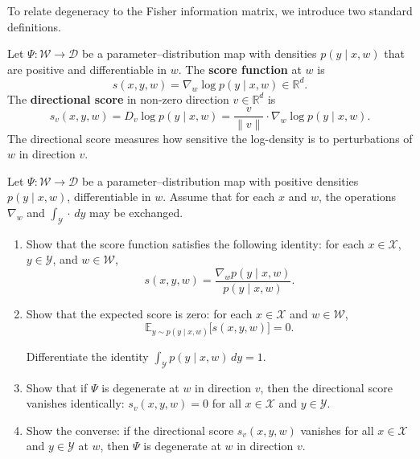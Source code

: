 \documentclass[11pt]{article}
\newcommand{\R}{\mathbb{R}}
\newcommand{\E}{\mathbb{E}}
\newcommand{\X}{\mathcal{X}}
\newcommand{\Y}{\mathcal{Y}}
\newcommand{\W}{\mathcal{W}}
\newcommand{\D}{\mathcal{D}}
\begin{document}
To relate degeneracy to the Fisher information matrix, we introduce two
standard definitions.

\begin{definition}
\label{def:score}
    Let $\Psi : \W \to \D$ be a parameter--distribution map with densities
    $p(y \mid x, w)$ that are positive and differentiable in $w$.
    The \textbf{score function} at $w$ is
    \begin{equation}\label{eq:score}
        s(x, y, w) = \nabla_w \log p(y \mid x, w) \in \R^d.
    \end{equation}
    The \textbf{directional score} in non-zero direction $v \in \R^d$ is
    \begin{equation}\label{eq:directional-score}
        s_v(x, y, w)
        = D_v \log p(y \mid x, w)
        = \frac{v}{\|v\|} \cdot \nabla_w \log p(y \mid x, w).
    \end{equation}
    The directional score measures how sensitive the log-density is to
    perturbations of $w$ in direction $v$.
\end{definition}

\begin{exercise}
\label{ex:score-properties}
    Let $\Psi : \W \to \D$ be a parameter--distribution map with positive
    densities $p(y \mid x, w)$, differentiable in $w$. Assume that for
    each $x$ and $w$, the operations $\nabla_w$ and
    $\int_\Y \cdot\, dy$ may be exchanged.
\begin{enumerate}
    \item
        Show that the score function satisfies the following identity:
        for each $x \in \X$, $y \in \Y$, and $w \in \W$,
        \begin{equation}\label{eq:score-identity}
            s(x,y,w) = \frac{\nabla_w p(y \mid x,w)}{p(y \mid x,w)}.
        \end{equation}
    \item
        Show that the expected score is zero: for each $x \in \X$ and
        $w \in \W$,
        \begin{equation}
            \E_{y \sim p(y \mid x, w)}\bigl[s(x, y, w)\bigr] = 0.
        \end{equation}
        \begin{hint}
Differentiate the identity
            $\int_\Y p(y \mid x, w) \, dy = 1$.
        \end{hint}
    \item\label{ex:score-properties:b}
        Show that if $\Psi$ is degenerate at $w$ in direction $v$, then
        the directional score vanishes identically:
            $s_v(x, y, w) = 0$
        for all $x \in \X$ and $y \in \Y$.
    \item\label{ex:score-properties:c}
        Show the converse: if the directional score $s_v(x, y, w)$
        vanishes for all $x \in \X$ and $y \in \Y$ at $w$, then $\Psi$ is
        degenerate at $w$ in direction $v$.
\end{enumerate}
\end{exercise}
\end{document}
